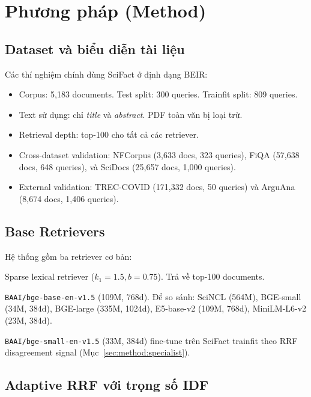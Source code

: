 \section{Phương pháp (Method)}
\label{sec:method}

\subsection{Dataset và biểu diễn tài liệu}
\label{sec:method:data}
Các thí nghiệm chính dùng SciFact ở định dạng BEIR:
\begin{itemize}[leftmargin=1.6em,itemsep=1pt]
  \item Corpus: 5{,}183 documents. Test split: 300 queries. Trainfit split: 809 queries.
  \item Text sử dụng: chỉ \emph{title} và \emph{abstract}. PDF toàn văn bị loại trừ.
  \item Retrieval depth: top-100 cho tất cả các retriever.
  \item Cross-dataset validation: NFCorpus (3{,}633 docs, 323 queries), FiQA (57{,}638 docs, 648 queries),
        và SciDocs (25{,}657 docs, 1{,}000 queries).
  \item External validation: TREC-COVID (171{,}332 docs, 50 queries) và ArguAna (8{,}674 docs, 1{,}406 queries).
\end{itemize}

\subsection{Base Retrievers}
\label{sec:method:pipeline}

Hệ thống gồm ba retriever cơ bản:

\begin{description}[leftmargin=1.6em,style=nextline,itemsep=2pt]
  \item[BM25.] Sparse lexical retriever ($k_1=1.5, b=0.75$). Trả về top-100 documents.
  \item[Dense (BGE-base).] \texttt{BAAI/bge-base-en-v1.5} (109M, 768d). Để so sánh: SciNCL (564M),
  BGE-small (34M, 384d), BGE-large (335M, 1024d), E5-base-v2 (109M, 768d), MiniLM-L6-v2 (23M, 384d).
  \item[Dense (BGE-small fine-tuned).] \texttt{BAAI/bge-small-en-v1.5} (33M, 384d) fine-tune trên
  SciFact trainfit theo RRF disagreement signal (Mục~\ref{sec:method:specialist}).
\end{description}

\subsection{Adaptive RRF với trọng số IDF}
\label{sec:method:adaptive-rrf}

